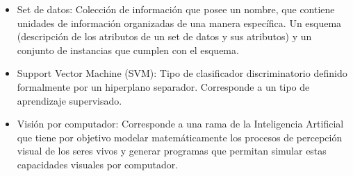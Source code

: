 \begin{itemize}
\item Set de datos: Colección de información que posee un nombre, que contiene unidades de información organizadas de una manera específica. Un esquema (descripción de los atributos de un set de datos y sus atributos) y un conjunto de instancias que cumplen con el esquema.

\item Support Vector Machine (SVM): Tipo de clasificador discriminatorio definido formalmente por un hiperplano separador. Corresponde a un tipo de aprendizaje supervisado.

\item Visión por computador: Corresponde a una rama de la Inteligencia Artificial que tiene por objetivo modelar matemáticamente los procesos de percepción visual de los seres vivos y generar programas que permitan simular estas capacidades visuales por computador.

\end{itemize}
